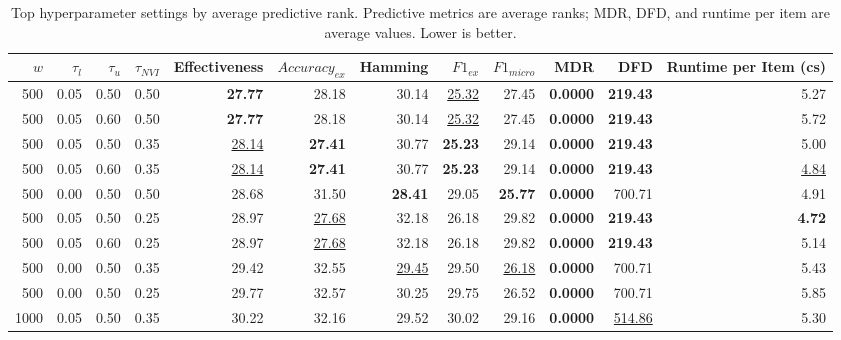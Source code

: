 \begin{table}[t]
\centering
\caption{Top hyperparameter settings by average predictive rank. Predictive metrics are average ranks; MDR, DFD, and runtime per item are average values. Lower is better.}
\label{tab:hyperparameter_average_ranks}
\begin{tabular}{rrrrrrrrrrrr}
\toprule
$w$ & $\tau_l$ & $\tau_u$ & $\tau_{NVI}$ & Effectiveness & $Accuracy_{ex}$ & Hamming & $F1_{ex}$ & $F1_{micro}$ & MDR & DFD & Runtime per Item (cs) \\
\midrule
500 & 0.05 & 0.50 & 0.50 & \textbf{27.77} & 28.18 & 30.14 & \underline{25.32} & 27.45 & \textbf{0.0000} & \textbf{219.43} & 5.27 \\
500 & 0.05 & 0.60 & 0.50 & \textbf{27.77} & 28.18 & 30.14 & \underline{25.32} & 27.45 & \textbf{0.0000} & \textbf{219.43} & 5.72 \\
500 & 0.05 & 0.50 & 0.35 & \underline{28.14} & \textbf{27.41} & 30.77 & \textbf{25.23} & 29.14 & \textbf{0.0000} & \textbf{219.43} & 5.00 \\
500 & 0.05 & 0.60 & 0.35 & \underline{28.14} & \textbf{27.41} & 30.77 & \textbf{25.23} & 29.14 & \textbf{0.0000} & \textbf{219.43} & \underline{4.84} \\
500 & 0.00 & 0.50 & 0.50 & 28.68 & 31.50 & \textbf{28.41} & 29.05 & \textbf{25.77} & \textbf{0.0000} & 700.71 & 4.91 \\
500 & 0.05 & 0.50 & 0.25 & 28.97 & \underline{27.68} & 32.18 & 26.18 & 29.82 & \textbf{0.0000} & \textbf{219.43} & \textbf{4.72} \\
500 & 0.05 & 0.60 & 0.25 & 28.97 & \underline{27.68} & 32.18 & 26.18 & 29.82 & \textbf{0.0000} & \textbf{219.43} & 5.14 \\
500 & 0.00 & 0.50 & 0.35 & 29.42 & 32.55 & \underline{29.45} & 29.50 & \underline{26.18} & \textbf{0.0000} & 700.71 & 5.43 \\
500 & 0.00 & 0.50 & 0.25 & 29.77 & 32.57 & 30.25 & 29.75 & 26.52 & \textbf{0.0000} & 700.71 & 5.85 \\
1000 & 0.05 & 0.50 & 0.35 & 30.22 & 32.16 & 29.52 & 30.02 & 29.16 & \textbf{0.0000} & \underline{514.86} & 5.30 \\
\bottomrule
\end{tabular}
\end{table}
